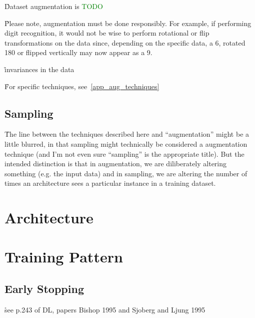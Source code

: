 \r{Dataset augmentation is \textcolor{green}{TODO}}

\r{Please note, augmentation must be done responsibly. For example, if performing digit recognition, it would not be wise to perform rotational or flip transformations on the data since, depending on the specific data, a 6, rotated 180 or flipped vertically may now appear as a 9.}


\r{invariances in the data}

\r{For specific techniques, see~\ref{app_aug_techniques}}



\subsection{Sampling}

\r{The line between the techniques described here and ``augmentation'' might be a little blurred, in that sampling might technically be considered a augmentation technique (and I'm not even sure ``sampling'' is the appropriate title). But the intended distinction is that in augmentation, we are diliberately altering something (e.g. the input data) and in sampling, we are altering the number of times an architecture sees a particular instance in a training dataset.}




\section{Architecture}

\section{Training Pattern}

\subsection{Early Stopping}

\r{see p.243 of DL, papers Bishop 1995 and Sjoberg and Ljung 1995}

